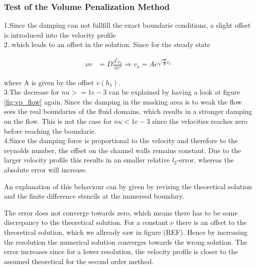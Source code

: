 \subsubsection{Test of the Volume Penalization Method}
1.Since the damping can not fullfill the exact boundarie conditions, a slight offset is introduced into the velocity profile\\

2.
which leads to an offset in the solution.
Since for the steady state

\begin{align}
 \nu v &= D \frac{\partial^2 v_x}{\partial z^2}  \Rightarrow  v_x = A e^{\sqrt{\frac{\nu}{D}}v_x}
\end{align}

where A is given by the offset $v(h_1)$.\\

3.The decrease for $nu>=1e-3$ can be explained by having a look at figure \ref{fig:vp_flow} again. Since the damping in the masking area is to
weak the flow sees the real boundaries of the fluid domains, which results in a stronger damping on the flow.
This is not the case for $nu<1e-3$ since the velocities reaches zero before reaching the boundarie.\\

4.Since the damping force is proportional to the velocity and therefore to the reynolds number, the offset on the channel walls remains constant.
Due to the larger velocity profile this results in an smaller relative $l_2$-error, whereas the absolute error will increase.

An explanation of this behaviour can by given by revising the theoretical solution and the finite difference stencils at the immersed boundary.

The error does not converge towards zero, which means there has to be some discrepancy to the theoretical solution.
For a constant $\nu$ there is an offset to the theoretical solution, which we allready saw in figure (REF).
Hence by increasing the resolution the numerical solution converges towards the wrong solution.
The error increases since for a lower resolution, the velocity profile is closer to the assumed theoretical for the second order method.

